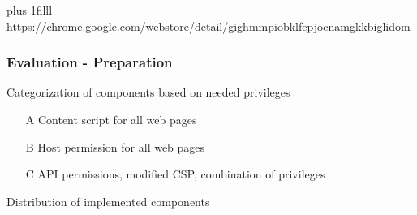 \documentclass[accentcolor=tud9c,colorbacktitle,xcolor=dvipsnames]{tudbeamer}
\begin{document}
{ %
    \begin{frame}[plain]
        \vskip0pt plus 1filll
        \url{https://chrome.google.com/webstore/detail/gighmmpiobklfepjocnamgkkbiglidom}
    \end{frame}
}

\begin{frame}[fragile]
    \frametitle{Evaluation - Preparation}
    \begin{block}{Categorization of components based on needed privileges}
        \begin{itemize}
            \itemsep1em
            \item[A] Content script for all web pages
            \item[B] Host permission for all web pages
            \item[C] API permissions, modified CSP, combination of privileges 
        \end{itemize}
    \end{block}
    \begin{block}{Distribution of implemented components}
        \hspace{0.1cm}
    \end{block}
\end{frame}
\end{document}
